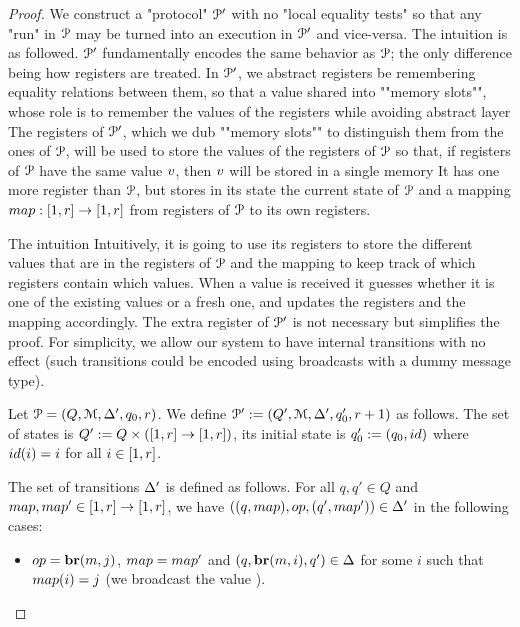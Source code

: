 \begin{proof}
	We construct a "protocol" $\mathcal{P}'$ with no "local equality tests" so that any "run" in $\mathcal{P}$ may be turned into an execution in $\mathcal{P}'$ and vice-versa. 
	The intuition is as followed. $\mathcal{P}'$ fundamentally encodes the same behavior as $\mathcal{P}$; the only difference being how registers are treated. In $\mathcal{P}'$, we abstract registers be remembering equality relations between them, so that a value shared into ""memory slots"", whose role is to remember the values of the registers while avoiding abstract layer  The registers of $\mathcal{P}'$, which we dub ""memory slots"" to distinguish them from the ones of $\mathcal{P}$, will be used to store the values of the registers of $\mathcal{P}$ so that, if registers of $\mathcal{P}$ have the same value $v$, then $v$ will be stored in a single memory 
	 It has one more register than $\mathcal{P}$, but stores in its state the current state of $\mathcal{P}$ and a mapping $map : [1,r] \to [1,r]$ from registers of $\mathcal{P}$ to its own registers.
	
	The intuition 
	Intuitively, it is going to use its registers to store the different values that are in the registers of $\mathcal{P}$ and the mapping to keep track of which registers contain which values.
	When a value is received it guesses whether it is one of the existing values or a fresh one, and updates the registers and the mapping accordingly.
	The extra register of $\mathcal{P}'$ is not necessary but simplifies the proof.
	For simplicity, we allow our system to have internal transitions with no effect (such transitions could be encoded using broadcasts with a dummy message type). 
	
	
	Let $\mathcal{P} = (Q, \mathcal{M}, \Delta', q_0, r)$. 
	We define $\mathcal{P}' := (Q', \mathcal{M}, \Delta', q_0', r +1)$ as follows. The set of states is $Q' := Q \times ([1,r] \to [1,r])$, its initial state is $q_0' := (q_0, \idmap)$ where $\idmap(i) = i$ for all $i \in [1,r]$. 
	
	The set of transitions $\Delta'$ is defined as follows.
	For all $q,q' \in Q$ and $\map, \map' \in \nset{1}{r} \to \nset{1}{r}$, we have $((q, \map), \op, (q', \map')) \in \transitions'$ in the following cases:
	
	\begin{itemize}
		\item $\op = \br{m}{j}$, 
		$\map = \map'$ and $(q, \textbf{br}(m, i), q') \in \Delta$ for some $i$ such that $\map(i) = j$ (we broadcast the value ).
		

\end{itemize}
\end{proof}
